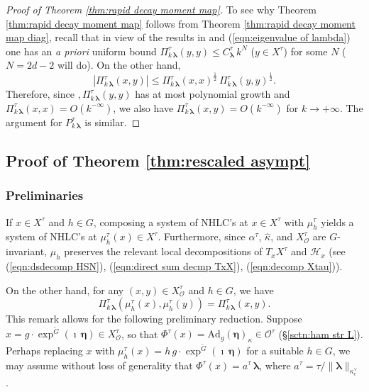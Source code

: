 \documentclass[12pt,a4paper]{article}
\theoremstyle{plain}
\theoremstyle{definition}
\begin{document}
\begin{proof}
[Proof of Theorem \ref{thm:rapid decay moment map}]
To see why Theorem \ref{thm:rapid decay moment map} follows from
Theorem \ref{thm:rapid decay moment map diag}, recall that
in view of the results in \cite{cr1} and (\ref{eqn:eigenvalue of lambda})
one has an \textit{a priori} uniform
bound $\Pi^\tau_{k\,\boldsymbol{\lambda}}(y,y)\le 
C^\tau_{\boldsymbol{\lambda}}\,k^N $ ($y\in X^\tau$) for some $N$ ($N=2d-2$ will do).
On the other hand,
$$
\left|\Pi^\tau_{k\,\boldsymbol{\lambda}}(x,y)\right|\le 
\Pi^\tau_{k\,\boldsymbol{\lambda}}(x,x)^{\frac{1}{2}}\,\Pi^\tau_{k\,\boldsymbol{\lambda}}(y,y)^{\frac{1}{2}}.
$$
Therefore, since $,\Pi^\tau_{k\,\boldsymbol{\lambda}}(y,y)$ has at most
polynomial growth and $\Pi^\tau_{k\,\boldsymbol{\lambda}}(x,x)
=O\left(k^{-\infty}\right)$, we also have $\Pi^\tau_{k\,\boldsymbol{\lambda}}(x,y)
=O\left(k^{-\infty}\right)$ for $k\rightarrow +\infty$.
The argument for $P^\tau_{k\,\boldsymbol{\lambda}}$ is similar.
\end{proof}

\subsection{Proof of Theorem \ref{thm:rescaled asympt}}


\subsubsection{Preliminaries}
\label{sctn:reductions initial}

If $x\in X^\tau$ and $h\in G$,
composing a system of NHLC's at $x\in X^\tau$
with $\mu^\tau_h$ yields a system of NHLC's 
at $\mu^\tau_h(x)\in X^\tau$. Furthermore, 
since $\alpha^\tau$, $\hat{\kappa}$, and $X^\tau_{\mathcal{O}}$ are $G$-invariant, $\mu_h$ preserves
the relevant local decompositions of 
$T_xX^\tau$ and
$\mathcal{H}_x$ (see
(\ref{eqn:dsdecomp HSN}), (\ref{eqn:direct sum decmp TxX}), (\ref{eqn:decomp Xtau})).

On the other hand, for any $(x,y)\in X^\tau_{\mathcal{O}}$ and
$h\in G$, we have 
$$\Pi^\tau_{k\,\boldsymbol{\lambda}}
\left(\mu_h^\tau(x),\mu^\tau_h(y)  \right)
=\Pi^\tau_{k\,\boldsymbol{\lambda}}(x,y).$$
This remark allows for the following preliminary reduction.
Suppose 
$x=g\cdot\exp^{\tilde{G}}(\imath\,\boldsymbol{\eta}) 
\in X_{\mathcal{O}}^\tau$, so that
$\Phi^\tau(x)=
\mathrm{Ad}_g(\boldsymbol{\eta})_\kappa\in 
\mathcal{O}^\tau$
(\S \ref{sctn:ham str L}).
Perhaps replacing $x$ with $\mu^\tau_h(x)=
h\,g\cdot\exp^{\tilde{G}}(\imath\,\boldsymbol{\eta}) $
for a suitable $h\in G$, we may assume without loss
of generality that $\Phi^\tau(x)=a^\tau\,\boldsymbol{\lambda}$,
where $a^\tau=\tau/\|\boldsymbol{\lambda}\|_{\kappa_e^\vee}$.
\end{document}
